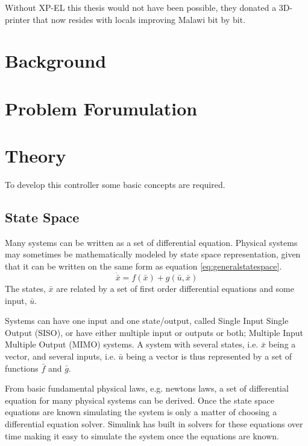 \documentclass{article}
\begin{document}
Without XP-EL this thesis would not have been possible, they donated a 3D-printer that now resides with locals improving Malawi bit by bit.

\newpage

\tableofcontents

\newpage

\newpage

\section{Background}


\section{Problem Forumulation}


\section{Theory}
To develop this controller some basic concepts are required.
\subsection{State Space}
Many systems can be written as a set of differential equation.
Physical systems may sometimes be mathematically modeled by state space representation, given that it can be written on the same form as equation \ref{eq:generalstatespace}.
\begin{equation}
    \dot{\bar{x}} = f(\bar{x}) + g(\bar{u},\bar{x})
    \label{eq:generalstatespace}
\end{equation}
The states, $\bar{x}$ are related by a set of first order differential equations and some input, $\bar{u}$.

Systems can have one input and one state/output, called Single Input Single Output (SISO), or have either multiple input or outputs or both; Multiple Input Multiple Output (MIMO) systems.
A system with several states, i.e. $\bar{x}$ being a vector, and several inputs, i.e. $\bar{u}$ being a vector is thus represented by a set of functions $\bar{f}$ and $\bar{g}$.

From basic fundamental physical laws, e.g. newtons laws, a set of differential equation for many physical systems can be derived.
Once the state space equations are known simulating the system is only a matter of choosing a differential equation solver.
Simulink has built in solvers for these equations over time making it easy to simulate the system once the equations are known.
\end{document}
